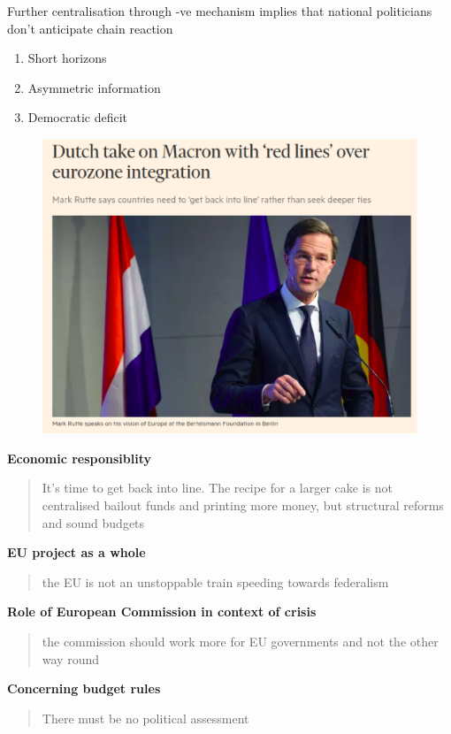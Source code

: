 \documentclass{beamer}
\begin{document}
\begin{frame}
  Further centralisation through -ve mechanism implies that national politicians don't anticipate chain reaction  
  \medskip
  \begin{enumerate}
    \item Short horizons
    \item Asymmetric information
    \item Democratic deficit
  \end{enumerate}
\end{frame}

\begin{frame}
  \begin{figure}
    \includegraphics[scale=.4]{rutte.eps}
  \end{figure}
\end{frame}

\begin{frame}
  \textbf{Economic responsiblity}
  \begin{quote}
    It’s time to get back into line. The recipe for a larger cake is not centralised bailout funds and printing more money, but structural reforms and sound budgets
  \end{quote}
  \textbf{EU project as a whole}
  \begin{quote}
   the EU is not an unstoppable train speeding towards federalism
 \end{quote}
 \textbf{Role of European Commission in context of crisis} 
 \begin{quote}
   the commission should work more for EU governments and not the other way round
 \end{quote}
 \textbf{Concerning budget rules}
 \begin{quote}
   There must be no political assessment
 \end{quote}
\end{frame}
\end{document}
